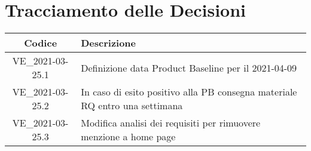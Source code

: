 \section*{Tracciamento delle Decisioni}

\begin{center}
	\begin{longtable}{|c|p{13cm}|}
	\hline
	\rowcolor{lighter-grayer}
	\textbf{Codice} & \textbf{Descrizione} \\
	\hline
	\endfirsthead
	\hline
	VE\_2021-03-25.1 & Definizione data Product Baseline per il 2021-04-09 \\
	VE\_2021-03-25.2 & In caso di esito positivo alla PB consegna materiale RQ entro una settimana \\
	VE\_2021-03-25.3 & Modifica analisi dei requisiti per rimuovere menzione a home page \\
	\hline

	\end{longtable}
\end{center}
